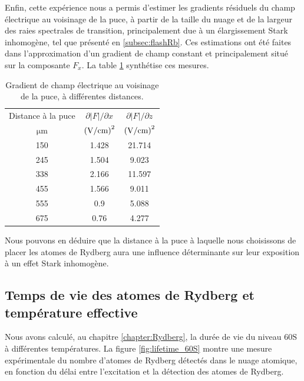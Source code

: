 Enfin, cette expérience nous a permis d'estimer les gradients résiduels du champ électrique au voisinage de la puce, à partir de la taille du nuage et de la largeur des raies spectrales de transition, principalement due à un élargissement Stark inhomogène, tel que présenté en \ref{subsec:flashRb}.
Ces estimations ont été faites dans l'approximation d'un gradient de champ constant et principalement situé sur la composante $F_x$.
La table \ref{tab:fieldGrad} synthétise ces mesures.
%
\begin{table}[!h]
	\centering
	\caption[Estimation des gradients de champ électrique près de la puce]{Gradient de champ électrique au voisinage de la puce, à différentes distances.%
	}
	\label{tab:fieldGrad}
	\begin{tabular}{c c c}
		\toprule\midrule
		Distance à la puce
		& $\partial |F| / \partial x$
		& $\partial |F| / \partial z$\\		
		$\si{\um}$
		& $\si{(\V/\cm)\squared}$
		& $\si{(\V/\cm)\squared}$\\
		\midrule
		\SI{150}{} & \SI{1.428}{} & \SI{21.714}{} \\
		\SI{245}{} & \SI{1.504}{} & \SI{9.023}{} \\
		\SI{338}{} & \SI{2.166}{} & \SI{11.597}{} \\
		\SI{455}{} & \SI{1.566}{} & \SI{9.011}{} \\
		\SI{555}{} & \SI{0.9}{} & \SI{5.088}{} \\
		\SI{675}{} & \SI{0.76}{} & \SI{4.277}{} \\
		\midrule
		\bottomrule
 	\end{tabular}
\end{table}
%

Nous pouvons en déduire que la distance à la puce à laquelle nous choisissons de placer les atomes de Rydberg aura une influence déterminante sur leur exposition à un effet Stark inhomogène.

\subsection{Temps de vie des atomes de Rydberg et température effective}\label{subsec:lifetime}
\noindent Nous avons calculé, au chapitre \ref{chapter:Rydberg}, la durée de vie du niveau $\mathrm{60S}$ à différentes températures.
La figure \ref{fig:lifetime_60S} montre une mesure expérimentale du nombre d'atomes de Rydberg détectés dans le nuage atomique, en fonction du délai entre l'excitation et la détection des atomes de Rydberg.

